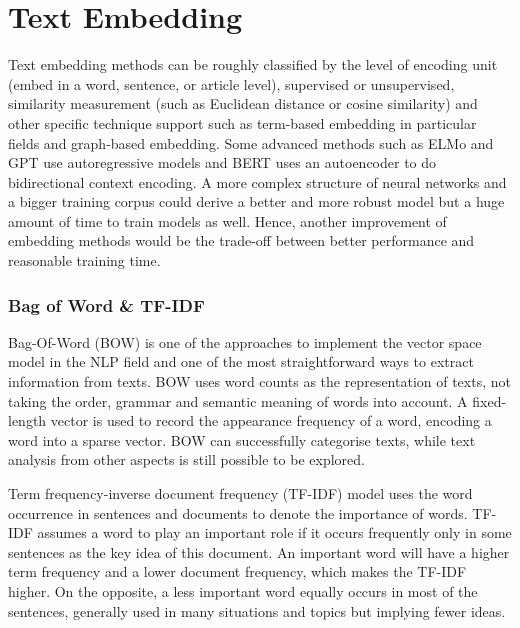 \section{Text Embedding}
Text embedding methods can be roughly classified by the level of encoding unit (embed in a word, sentence, or article level), supervised or unsupervised, similarity measurement (such as Euclidean distance or cosine similarity) and other specific technique support such as term-based embedding in particular fields and graph-based embedding.
Some advanced methods such as ELMo\cite{peters2018} and GPT\cite{brown2020} use autoregressive models and BERT\cite{niven2019} uses an autoencoder to do bidirectional context encoding.
A more complex structure of neural networks and a bigger training corpus could derive a better and more robust model but a huge amount of time to train models as well.
Hence, another improvement of embedding methods would be the trade-off between better performance and reasonable training time.

\subsubsection{Bag of Word \& TF-IDF}
Bag-Of-Word (BOW) is one of the approaches to implement the vector space model\cite{salton1975} in the NLP field and one of the most straightforward ways to extract information from texts.
BOW uses word counts as the representation of texts, not taking the order, grammar and semantic meaning of words into account.
A fixed-length vector is used to record the appearance frequency of a word, encoding a word into a sparse vector.\cite{sethy2008}
BOW can successfully categorise texts\cite{zhang2010}, while text analysis from other aspects is still possible to be explored.

Term frequency-inverse document frequency (TF-IDF) model uses the word occurrence in sentences and documents to denote the importance of words.
TF-IDF assumes a word to play an important role if it occurs frequently only in some sentences as the key idea of this document.
An important word will have a higher term frequency and a lower document frequency, which makes the TF-IDF higher.
On the opposite, a less important word equally occurs in most of the sentences, generally used in many situations and topics but implying fewer ideas.\cite{li2011}

